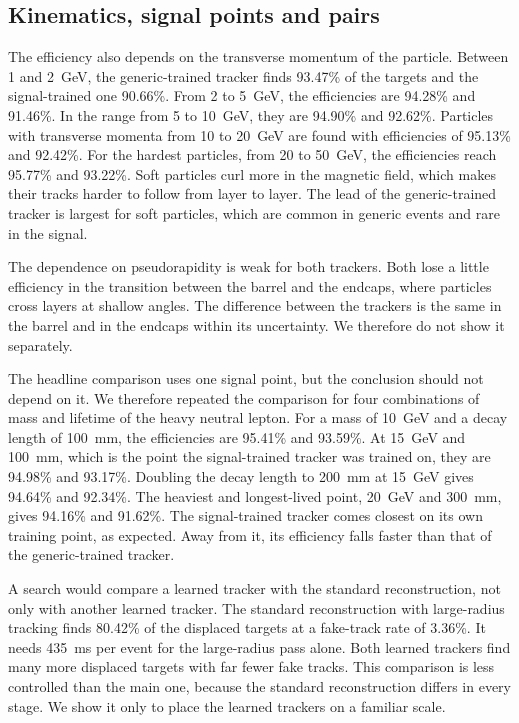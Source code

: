\subsection{Kinematics, signal points and pairs}
\label{sec:kinematics}

The efficiency also depends on the transverse momentum of the particle. Between 1 and 2~GeV, the
generic-trained tracker finds 93.47\% of the targets and the signal-trained one 90.66\%. From 2 to
5~GeV, the efficiencies are 94.28\% and 91.46\%. In the range from 5 to 10~GeV, they are 94.90\% and
92.62\%. Particles with transverse momenta from 10 to 20~GeV are found with efficiencies of 95.13\%
and 92.42\%. For the hardest particles, from 20 to 50~GeV, the efficiencies reach 95.77\% and
93.22\%. Soft particles curl more in the magnetic field, which makes their tracks harder to follow
from layer to layer. The lead of the generic-trained tracker is largest for soft particles, which
are common in generic events and rare in the signal.

The dependence on pseudorapidity is weak for both trackers. Both lose a little efficiency in the
transition between the barrel and the endcaps, where particles cross layers at shallow angles. The
difference between the trackers is the same in the barrel and in the endcaps within its uncertainty.
We therefore do not show it separately.

The headline comparison uses one signal point, but the conclusion should not depend on it. We
therefore repeated the comparison for four combinations of mass and lifetime of the heavy neutral
lepton. For a mass of 10~GeV and a decay length of 100~mm, the efficiencies are 95.41\% and 93.59\%.
At 15~GeV and 100~mm, which is the point the signal-trained tracker was trained on, they are 94.98\%
and 93.17\%. Doubling the decay length to 200~mm at 15~GeV gives 94.64\% and 92.34\%. The heaviest
and longest-lived point, 20~GeV and 300~mm, gives 94.16\% and 91.62\%. The signal-trained tracker
comes closest on its own training point, as expected. Away from it, its efficiency falls faster than
that of the generic-trained tracker.

A search would compare a learned tracker with the standard reconstruction, not only with another
learned tracker. The standard reconstruction with large-radius tracking finds 80.42\% of the
displaced targets at a fake-track rate of 3.36\%. It needs 435~ms per event for the large-radius
pass alone. Both learned trackers find many more displaced targets with far fewer fake tracks. This
comparison is less controlled than the main one, because the standard reconstruction differs in
every stage. We show it only to place the learned trackers on a familiar scale.

